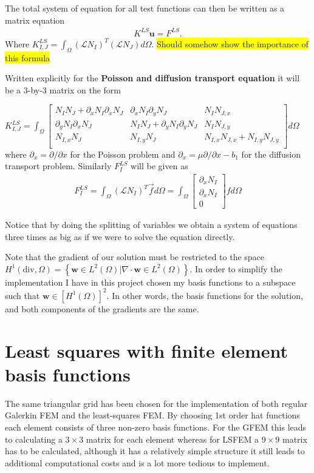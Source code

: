 The total system of equation for all test functions can then be written as a matrix equation 
\begin{align}
	K^{LS}\mathbf{u} = F^{LS}.
	\label{eq:matrixEq}
\end{align}
Where $K^{LS}_{I,J}=\int_{\Omega}(\mathcal{L}N_I)^T(\mathcal{L}N_J)d\Omega$. \colorbox{yellow}{Should somehow show the importance of this formula}

Written explicitly for the \textbf{Poisson and diffusion transport equation} it will be a 3-by-3 matrix on the form 

$
K^{LS}_{I,J} = \int_{\Omega}
\begin{bmatrix}
	N_IN_J + \partial_x N_{I} \partial_xN_{J} & \partial_x N_{I}\partial_y N_{J} & N_IN_{J,x} \\ 	
	\partial_yN_{I}\partial_xN_{J} &N_IN_J + \partial_yN_{I}\partial_yN_{J} &  N_IN_{J,y} \\ 	
	N_{I,x}N_J & N_{I,y}N_J & N_{I,x}N_{J,x} + N_{I,y}N_{J,y} \\ 	
	\label{mat:basicPoisson}
\end{bmatrix}
d\Omega
$
where $\partial_x = \partial / \partial x $ for the Poisson problem and $\partial_x = \mu \partial / \partial x - b_1$ for the diffusion transport problem. Similarly $F^{LS}_I$ will be given as 
\begin{align}
	F_I^{LS} = \int_{\Omega}(\mathcal{L}N_I)^T\vec{f} d\Omega = 
	\int_{\Omega}
\begin{bmatrix}
	\partial_xN_I \\
	\partial_xN_I \\
	0
\end{bmatrix}
	f d\Omega
	\label{eq:rhsFunctional}
\end{align}

Notice that by doing the splitting of variables we obtain a system of equations three times as big as if we were to solve the equation directly. 

Note that the gradient of our solution must be restricted to the space $H^1(\text{div},\Omega) = \left\{  \mathbf{w}\in L^2(\Omega) | \nabla \cdot \mathbf{w} \in L^2(\Omega)\right\} $. In order to simplify the implementation I have in this project chosen my basis functions to a subspace such that $\mathbf{w}\in [H^1(\Omega)]^2$. In other words, the basis functions for the solution, and both components of the gradients are the same.  
\section{Least squares with finite element basis functions}
The same triangular grid has been chosen for the implementation of both regular Galerkin FEM and the least-squares FEM. By choosing 1st order hat functions each element consists of three non-zero basis functions. For the GFEM this leads to calculating a $3\times 3$ matrix for each element whereas for LSFEM a $9 \times 9$ matrix has to be calculated, although it has a relatively simple structure it still leads to additional computational costs and is a lot more tedious to implement.

